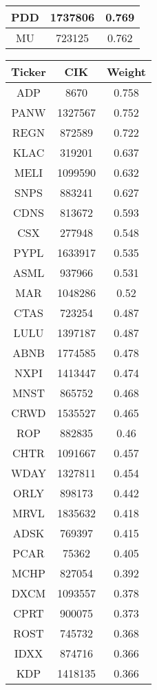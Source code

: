 \documentclass[logo,bsc,singlespacing,parskip]{infthesis}
\begin{document}
\begin{longtable}
\begin{tabular}[t]{|c|c|c|}
PDD & 1737806 & 0.769 \\ \hline
MU & 723125 & 0.762 \\ \hline 
                \end{tabular}
                \hfill
                \begin{tabular}[t]{|c|c|c|}
                    \hline
                    \textbf{Ticker} & \textbf{CIK} & \textbf{Weight} \\ \hline
ADP & 8670 & 0.758 \\ \hline
PANW & 1327567 & 0.752 \\ \hline
REGN & 872589 & 0.722 \\ \hline
KLAC & 319201 & 0.637 \\ \hline
MELI & 1099590 & 0.632 \\ \hline
SNPS & 883241 & 0.627 \\ \hline
CDNS & 813672 & 0.593 \\ \hline
CSX & 277948 & 0.548 \\ \hline
PYPL & 1633917 & 0.535 \\ \hline
ASML & 937966 & 0.531 \\ \hline
MAR & 1048286 & 0.52 \\ \hline
CTAS & 723254 & 0.487 \\ \hline
LULU & 1397187 & 0.487 \\ \hline
ABNB & 1774585 & 0.478 \\ \hline
NXPI & 1413447 & 0.474 \\ \hline
MNST & 865752 & 0.468 \\ \hline
CRWD & 1535527 & 0.465 \\ \hline
ROP & 882835 & 0.46 \\ \hline
CHTR & 1091667 & 0.457 \\ \hline
WDAY & 1327811 & 0.454 \\ \hline
ORLY & 898173 & 0.442 \\ \hline
MRVL & 1835632 & 0.418 \\ \hline
ADSK & 769397 & 0.415 \\ \hline
PCAR & 75362 & 0.405 \\ \hline
MCHP & 827054 & 0.392 \\ \hline
DXCM & 1093557 & 0.378 \\ \hline
CPRT & 900075 & 0.373 \\ \hline
ROST & 745732 & 0.368 \\ \hline
IDXX & 874716 & 0.366 \\ \hline
KDP & 1418135 & 0.366 \\ \hline

\end{tabular}
\end{longtable}
\end{document}

